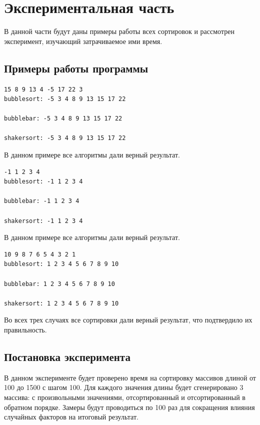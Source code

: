 \documentclass[a4paper, 14pt]{article}
\begin{document}
        \section{Экспериментальная часть}
        В данной части будут даны примеры работы всех сортировок и рассмотрен эксперимент, изучающий затрачиваемое ими время.
        \subsection{Примеры работы программы}
		\begin{lstlisting}[label=some-code,caption=Пример работы 1]        
15 8 9 13 4 -5 17 22 3 
bubblesort: -5 3 4 8 9 13 15 17 22 

bubblebar: -5 3 4 8 9 13 15 17 22 

shakersort: -5 3 4 8 9 13 15 17 22 

		\end{lstlisting}
		В данном примере все алгоритмы дали верный результат.
		\begin{lstlisting}[label=some-code,caption=Пример работы 2]		
-1 1 2 3 4 
bubblesort: -1 1 2 3 4 

bubblebar: -1 1 2 3 4 

shakersort: -1 1 2 3 4 

		\end{lstlisting}
		В данном примере все алгоритмы дали верный результат.
		\begin{lstlisting}[label=some-code,caption=Пример работы 3]		
10 9 8 7 6 5 4 3 2 1 
bubblesort: 1 2 3 4 5 6 7 8 9 10 

bubblebar: 1 2 3 4 5 6 7 8 9 10 

shakersort: 1 2 3 4 5 6 7 8 9 10 
		\end{lstlisting}
		Во всех трех случаях все сортировки дали верный результат, что подтвердило их правильность.
		
		\subsection{Постановка эксперимента}
		\parindent=1cm
		В данном эксперименте будет проверено время на сортировку массивов длиной от 100 до 1500 с шагом 100. Для каждого значения длины будет сгенерировано 3 массива: с произвольными значениями, отсортированный и отсортированный в обратном порядке. Замеры будут проводиться по 100 раз для сокращения влияния случайных факторов на итоговый результат. 
\end{document}
